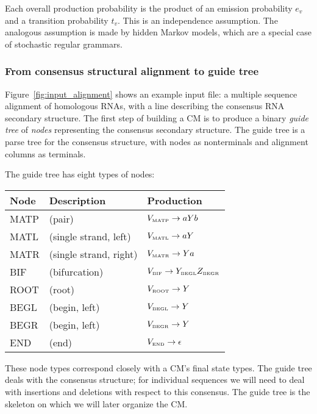 \documentclass[11pt]{article}
\begin{document}
Each overall production probability is the product of an emission
probability $e_v$ and a transition probability $t_v$. This is an
independence assumption. The analogous assumption is made by hidden
Markov models, which are a special case of stochastic regular
grammars.

\subsubsection{From consensus structural alignment to guide tree}

Figure~\ref{fig:input_alignment} shows an example input file: a
multiple sequence alignment of homologous RNAs, with a line describing
the consensus RNA secondary structure. The first step of building a CM
is to produce a binary \emph{guide tree} of \emph{nodes} representing
the consensus secondary structure. The guide tree is a parse tree for
the consensus structure, with nodes as nonterminals and alignment
columns as terminals.

The guide tree has eight types of nodes:

\begin{tabular}{lll}
Node      & Description      &  Production           \\ \hline
MATP  & (pair)                 & $V_{\mbox{\tiny MATP}} \rightarrow a Y b$  \\
MATL  & (single strand, left)  & $V_{\mbox{\tiny MATL}} \rightarrow a Y$   \\
MATR  & (single strand, right) & $V_{\mbox{\tiny MATR}} \rightarrow Y a$   \\
BIF   & (bifurcation)          & $V_{\mbox{\tiny BIF}}  \rightarrow
Y_{\mbox{\tiny BEGL}} Z_{\mbox{\tiny BEGR}}$ \\
ROOT  & (root)                 & $V_{\mbox{\tiny ROOT}} \rightarrow Y$       \\
BEGL  & (begin, left)          & $V_{\mbox{\tiny BEGL}} \rightarrow Y$       \\
BEGR  & (begin, left)          & $V_{\mbox{\tiny BEGR}} \rightarrow Y$       \\
END   & (end)                  & $V_{\mbox{\tiny END}}  \rightarrow \epsilon$ \\ \hline
\end{tabular}
 
These node types correspond closely with a CM's final state types.
The guide tree deals with the consensus structure; for individual
sequences we will need to deal with insertions and deletions with
respect to this consensus. The guide tree is the skeleton on which we
will later organize the CM.
\end{document}
